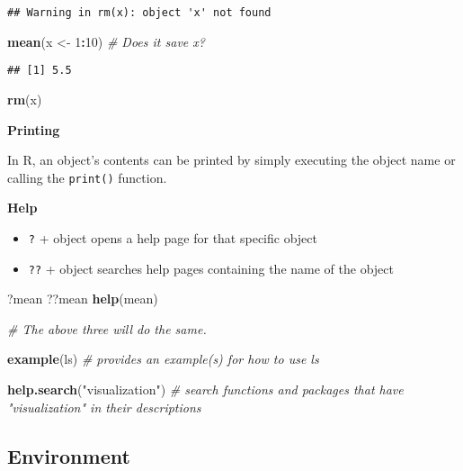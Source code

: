 \documentclass[
]{book}
\newenvironment{Shaded}{\begin{snugshade}}{\end{snugshade}}
\newcommand{\CommentTok}[1]{\textcolor[rgb]{0.56,0.35,0.01}{\textit{#1}}}
\newcommand{\DecValTok}[1]{\textcolor[rgb]{0.00,0.00,0.81}{#1}}
\newcommand{\KeywordTok}[1]{\textcolor[rgb]{0.13,0.29,0.53}{\textbf{#1}}}
\newcommand{\NormalTok}[1]{#1}
\newcommand{\OperatorTok}[1]{\textcolor[rgb]{0.81,0.36,0.00}{\textbf{#1}}}
\newcommand{\StringTok}[1]{\textcolor[rgb]{0.31,0.60,0.02}{#1}}
\providecommand{\tightlist}{%
  \setlength{\itemsep}{0pt}\setlength{\parskip}{0pt}}
\begin{document}
\begin{verbatim}
## Warning in rm(x): object 'x' not found
\end{verbatim}

\begin{Shaded}
\begin{Highlighting}[]
\KeywordTok{mean}\NormalTok{(x \textless{}{-}}\StringTok{ }\DecValTok{1}\OperatorTok{:}\DecValTok{10}\NormalTok{) }\CommentTok{\# Does it save x?}
\end{Highlighting}
\end{Shaded}

\begin{verbatim}
## [1] 5.5
\end{verbatim}

\begin{Shaded}
\begin{Highlighting}[]
\KeywordTok{rm}\NormalTok{(x)}
\end{Highlighting}
\end{Shaded}

\textbf{Printing}

In R, an object's contents can be printed by simply executing the object name or calling the \texttt{print()} function.

\textbf{Help}

\begin{itemize}
\tightlist
\item
  \texttt{?} + object opens a help page for that specific object
\item
  \texttt{??} + object searches help pages containing the name of the object
\end{itemize}

\begin{Shaded}
\begin{Highlighting}[]
\NormalTok{?mean}
\NormalTok{??mean}
\KeywordTok{help}\NormalTok{(mean)}

\CommentTok{\# The above three will do the same. }

\KeywordTok{example}\NormalTok{(ls) }\CommentTok{\# provides an example(s) for how to use ls }

\KeywordTok{help.search}\NormalTok{(}\StringTok{"visualization"}\NormalTok{) }\CommentTok{\# search functions and packages that have "visualization" in their descriptions}
\end{Highlighting}
\end{Shaded}

\hypertarget{environment}{%
\subsection{Environment}\label{environment}}
\end{document}
